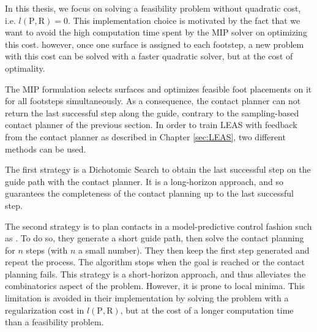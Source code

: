 In this thesis, we focus on solving a feasibility problem without quadratic cost, i.e. $l(\mbox{P},\mbox{R})=0$.
This implementation choice is motivated by the fact that we want to avoid the high computation time spent by the MIP solver on optimizing this cost.
however, once one surface is assigned to each footstep, a new problem with this cost can be solved with a faster quadratic solver, but at the cost of optimality.

The MIP formulation selects surfaces and optimizes feasible foot placements on it for all footsteps simultaneously.
As a consequence, the contact planner can not return the last successful step along the guide, contrary to the sampling-based contact planner of the previous section.
In order to train LEAS with feedback from the contact planner as described in Chapter \ref{sec:LEAS}, two different methods can be used.

The first strategy is a Dichotomic Search to obtain the last successful step on the guide path with the contact planner. 
It is a long-horizon approach, and so guarantees the completeness of the contact planning up to the last successful step. %

The second strategy is to plan contacts in a model-predictive control fashion such as \cite{fanny_mip_solo}. 
To do so, they generate a short guide path, then solve the contact planning for $n$ steps (with $n$ a small number).
They then keep the first step generated and repeat the process.
The algorithm stops when the goal is reached or the contact planning fails.
This strategy is a short-horizon approach, and thus alleviates the combinatorics aspect of the problem. 
However, it is prone to local minima.
This limitation is avoided in their implementation by solving the problem with a regularization cost in $l(\mbox{P},\mbox{R})$, but at the cost of a longer computation time than a feasibility problem.

